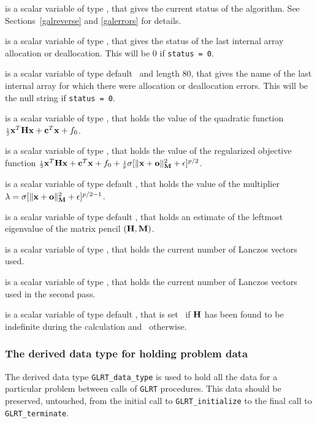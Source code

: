 \documentclass{galahad}
\newcommand{\packagename}{GL\-RT}
\begin{document}
\begin{description}
 is a scalar variable of type \integer, that gives the
current status of the algorithm. See Sections~\ref{galreverse} and
\ref{galerrors} for details.

 is a scalar variable of type \integer,
that gives the status of the last internal array allocation
or deallocation. This will be 0 if {\tt status = 0}.

 is a scalar variable of type default \character\
and length 80, that  gives the name of the last internal array
for which there were allocation or deallocation errors.
This will be the null string if {\tt status = 0}.

 is a scalar variable of type \realdp, that holds the
value of the quadratic function ${\scriptstyle \frac{1}{2}} {\mathbf{x}}^T {\mathbf{H}} {\mathbf{x}} + {\mathbf{c}}^T {\mathbf{x}} + f_0$.

 is a scalar variable of type \realdp, that
holds the value of the regularized objective function ${\scriptstyle \frac{1}{2}} {\mathbf{x}}^T {\mathbf{H}} {\mathbf{x}}
 + {\mathbf{c}}^T {\mathbf{x}} + f_0 +
  {\scriptstyle \frac{1}{p}} \sigma [ \| {\mathbf{x}} + {\mathbf{o}} \|_{{\mathbf{M}}}^2 + \epsilon ]^{p/2}$.

 is a scalar variable of type default
\realdp, that holds the value of the multiplier $\lambda =
\sigma [ \|{\mathbf{x}}+{\mathbf{o}}\|_{{\mathbf{M}}}^2 + \epsilon]^{p/2-1}$.

 is a scalar variable of type default
\realdp, that holds an estimate of the leftmost eigenvalue of the
matrix pencil $({\mathbf{H}},{\mathbf{M}})$.

 is a scalar variable of type \integer, that holds the
current number of Lanczos vectors used.

 is a scalar variable of type \integer, that holds the
current number of Lanczos vectors used in the second pass.

 is a scalar variable of type default \logical, that
is set \true\ if ${\mathbf{H}}$ has been found to be indefinite during the calculation
and \false\ otherwise.
\end{description}


\subsubsection{The derived data type for holding problem data}\label{typedata}
The derived data type
{\tt \packagename\_data\_type}
is used to hold all the data for a particular problem between calls of
{\tt \packagename} procedures.
This data should be preserved, untouched, from the initial call to
{\tt \packagename\_initialize}
to the final call to
{\tt \packagename\_terminate}.
\end{document}

